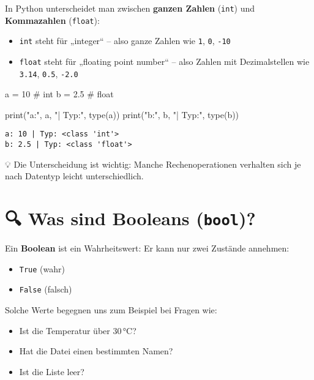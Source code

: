 \documentclass[
  letterpaper,
  DIV=11,
  numbers=noendperiod]{scrreprt}
\newenvironment{Shaded}{\begin{snugshade}}{\end{snugshade}}
\newcommand{\BuiltInTok}[1]{\textcolor[rgb]{0.00,0.23,0.31}{#1}}
\newcommand{\CommentTok}[1]{\textcolor[rgb]{0.37,0.37,0.37}{#1}}
\newcommand{\DecValTok}[1]{\textcolor[rgb]{0.68,0.00,0.00}{#1}}
\newcommand{\FloatTok}[1]{\textcolor[rgb]{0.68,0.00,0.00}{#1}}
\newcommand{\NormalTok}[1]{\textcolor[rgb]{0.00,0.23,0.31}{#1}}
\newcommand{\OperatorTok}[1]{\textcolor[rgb]{0.37,0.37,0.37}{#1}}
\newcommand{\StringTok}[1]{\textcolor[rgb]{0.13,0.47,0.30}{#1}}
\providecommand{\tightlist}{%
  \setlength{\itemsep}{0pt}\setlength{\parskip}{0pt}}\usepackage{longtable,booktabs,array}
\begin{document}
In Python unterscheidet man zwischen \textbf{ganzen Zahlen}
(\texttt{int}) und \textbf{Kommazahlen} (\texttt{float}):

\begin{itemize}
\tightlist
\item
  \texttt{int} steht für „integer`` -- also ganze Zahlen wie \texttt{1},
  \texttt{0}, \texttt{-10}
\item
  \texttt{float} steht für „floating point number`` -- also Zahlen mit
  Dezimalstellen wie \texttt{3.14}, \texttt{0.5}, \texttt{-2.0}
\end{itemize}

\begin{Shaded}
\begin{Highlighting}[]
\NormalTok{a }\OperatorTok{=} \DecValTok{10}       \CommentTok{\# int}
\NormalTok{b }\OperatorTok{=} \FloatTok{2.5}      \CommentTok{\# float}

\BuiltInTok{print}\NormalTok{(}\StringTok{"a:"}\NormalTok{, a, }\StringTok{"| Typ:"}\NormalTok{, }\BuiltInTok{type}\NormalTok{(a))}
\BuiltInTok{print}\NormalTok{(}\StringTok{"b:"}\NormalTok{, b, }\StringTok{"| Typ:"}\NormalTok{, }\BuiltInTok{type}\NormalTok{(b))}
\end{Highlighting}
\end{Shaded}

\begin{verbatim}
a: 10 | Typ: <class 'int'>
b: 2.5 | Typ: <class 'float'>
\end{verbatim}

💡 Die Unterscheidung ist wichtig: Manche Rechenoperationen verhalten
sich je nach Datentyp leicht unterschiedlich.

\section{\texorpdfstring{🔍 Was sind Booleans
(\texttt{bool})?}{🔍 Was sind Booleans (bool)?}}\label{was-sind-booleans-bool}

Ein \textbf{Boolean} ist ein Wahrheitswert: Er kann nur zwei Zustände
annehmen:

\begin{itemize}
\tightlist
\item
  \texttt{True} (wahr)
\item
  \texttt{False} (falsch)
\end{itemize}

Solche Werte begegnen uns zum Beispiel bei Fragen wie:

\begin{itemize}
\tightlist
\item
  Ist die Temperatur über 30\,°C?
\item
  Hat die Datei einen bestimmten Namen?
\item
  Ist die Liste leer?
\end{itemize}
\end{document}
